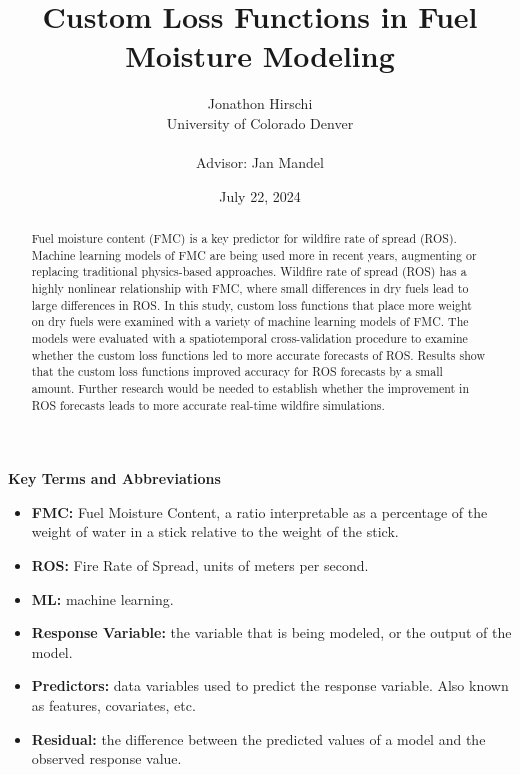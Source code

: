 \documentclass[11pt]{article}%
\begin{document}
 
\title{Custom Loss Functions in Fuel Moisture Modeling}
\author{
    \begin{tabular}[t]{c}
        Jonathon Hirschi \\
        University of Colorado Denver \\
        \\
        Advisor: Jan Mandel
    \end{tabular}
}

\date{July 22, 2024}
\maketitle

\begin{abstract}
Fuel moisture content (FMC) is a key predictor for wildfire rate of spread (ROS). Machine learning models of FMC are being used more in recent years, augmenting or replacing traditional physics-based approaches. Wildfire rate of spread (ROS) has a highly nonlinear relationship with FMC, where small differences in dry fuels lead to large differences in ROS. In this study, custom loss functions that place more weight on dry fuels were examined with a variety of machine learning models of FMC. The models were evaluated with a spatiotemporal cross-validation procedure to examine whether the custom loss functions led to more accurate forecasts of ROS. Results show that the custom loss functions improved accuracy for ROS forecasts by a small amount. Further research would be needed to establish whether the improvement in ROS forecasts leads to more accurate real-time wildfire simulations.
\end{abstract}

\textbf{Key Terms and Abbreviations}
\begin{itemize}
    \item \textbf{FMC:} Fuel Moisture Content, a ratio interpretable as a percentage of the weight of water in a stick relative to the weight of the stick.
    \item \textbf{ROS:} Fire Rate of Spread, units of meters per second.
    \item \textbf{ML:} machine learning.
    \item \textbf{Response Variable:} the variable that is being modeled, or the output of the model.
    \item \textbf{Predictors:} data variables used to predict the response variable. Also known as features, covariates, etc.
    \item \textbf{Residual:} the difference between the predicted values of a model and the observed response value.
\end{itemize}
\end{document}
